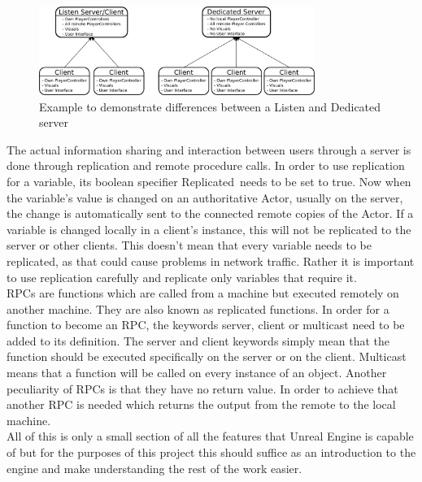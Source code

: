 \begin{figure}[htpb]
	\centering
	\includegraphics[width=0.8\textwidth]{fig/ListenvsDedicated.pdf}
	\caption[Difference between Listen and Dedicated Server]{Example to demonstrate differences between a Listen and Dedicated server\protect}
	\label{fig:ListenvDedicated}
\end{figure}

The actual information sharing and interaction between users through a server is done through replication and remote procedure calls\cite{bib:NetworkComp}. In order to use replication for a variable, its boolean specifier \glqq Replicated\grqq ~needs to be set to true. Now when the variable's value is changed on an authoritative Actor, usually on the server, the change is automatically sent to the connected remote copies of the Actor. If a variable is changed locally in a client's instance, this will not be replicated to the server or other clients. This doesn't mean that every variable needs to be replicated, as that could cause problems in network traffic. Rather it is important to use replication carefully and replicate only variables that require it.\\
\acp{RPC} are functions which are called from a machine but executed remotely on another machine. They are also known as replicated functions\cite{bib:NetworkComp}. In order for a function to become an RPC, the keywords server, client or multicast need to be added to its definition. The server and client keywords simply mean that the function should be executed specifically on the server or on the client. Multicast means that a function will be called on every instance of an object. Another peculiarity of RPCs is that they have no return value. In order to achieve that another RPC is needed which returns the output from the remote to the local machine.\\
All of this is only a small section of all the features that Unreal Engine is capable of but for the purposes of this project this should suffice as an introduction to the engine and make understanding the rest of the work easier.




